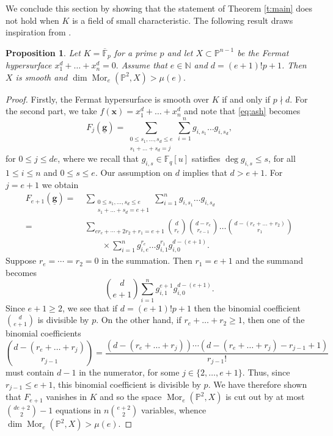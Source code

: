 \documentclass[12pt, reqno]{amsart}
\numberwithin{equation}{section}
\newcommand{\0}{\mathbf{0}}
\newcommand{\PP}{\mathbb{P}}
\newcommand{\FF}{\mathbb{F}}
\newcommand{\NN}{\mathbb{N}}
\renewcommand{\leq}{\leqslant}
\renewcommand{\geq}{\geqslant}
\newcommand{\x}{\mathbf{x}}
\def \Mor {\operatorname{Mor}}
\renewcommand{\=}{\equiv}
\newcommand{\1}{\mathbf{1}}
\newcommand{\g}{\mathbf{g}}
\newtheorem{proposition}[theorem]{Proposition}
\theoremstyle{definition}
\begin{document}
We conclude this section by showing that the statement of Theorem \ref{t:main} does not hold when $K$ is a field of small characteristic.
The following result draws inspiration from \cite[Lemma 2.1]{BS2}.

\begin{proposition}\label{p:small}
Let $K = \overline{\FF}_p$ for a prime $p$ and let $X \subset \PP^{n-1}$ be the Fermat hypersurface
$
x_1^d + \dots + x_n^d = 0.
$
Assume that $e \in \NN$ and $d = (e+1)! p + 1$. Then $X$ is smooth and
$
\dim \Mor_e (\PP^2, X) > \mu(e).
$
\end{proposition}

\begin{proof}
Firstly, the  Fermat hypersurface
is smooth over $K$ if and only if $p\nmid d$. For the second part, we take   $f (\x) = x_1^d + \dots + x_n^d$ and note that 
\eqref{eq:ash}  becomes
$$
F_j( \underline{ \g }  ) =
\sum_{ \substack{ 0 \leq s_1, \dots, s_d \leq  e \\ s_1 + \dots + s_d = j }} \sum_{i=1}^n    g_{i, s_1}   \dots  g_{i, s_d},
$$
for  $0 \leq j \leq d e$, where we recall that
$g_{i,s} \in \FF_q[u]$ satisfies  $\deg g_{i,s} \leq s$, for all $1 \leq i \leq n$ and $0 \leq s \leq e$.
Our assumption on $d$ implies that $d>e+1$.
For $j = e + 1$ we obtain
\begin{align*}
F_{e+1} ( \underline{ \g }  ) =~&
\sum_{ \substack{ 0 \leq s_1, \dots, s_d \leq  e \\ s_1 + \dots + s_d = e + 1 }} \sum_{i=1}^n    g_{i, s_1}   \dots  g_{i, s_d}
\\
=~&
\sum_{  e r_e + \cdots +  2r_2+ r_1 = e + 1   }
 \binom{d}{r_e}   \binom{d - r_e}{r_{e-1}}  \dots  \binom{d - (r_e + \dots + r_2)}{r_1 }\\
&\qquad \times  \sum_{i=1}^n    g_{i, e}^{r_e}   \dots   g_{i,1}^{r_1} g_{i,0}^{d -
(e + 1) }.
\end{align*}
Suppose $r_e=\cdots=r_2=0$
 in the summation. Then $r_1 = e + 1$ and the summand becomes
$$
\binom{d}{e + 1 }
\sum_{i=1}^n g_{i,1}^{e + 1} g_{i,0}^{d -
(e + 1) }.
$$
Since $e + 1 \geq 2$, we see that  if $d = (e+1)! p + 1$ then the binomial coefficient $\binom{d}{e + 1 }$ is divisible by $p$.
On the other hand, if $r_e + \dots + r_2 \geq 1$, then one of the binomial coefficients
$$
\binom{d - (r_e + \dots + r_j)}{r_{j-1} } = \frac{  (d - (r_e + \dots + r_j) ) \cdots ( d - (r_e + \dots + r_j) - r_{j-1} + 1 )  }{r_{j-1} !}
$$
must contain $d-1$ in the numerator,
for some $j\in \{2,\dots, e+1\}$.
Thus, since $r_{j-1} \leq e + 1$, this binomial coefficient is divisible by $p$.
We have therefore shown that $F_{e+1}$ vanishes in $K$ and so 
the space $\Mor_e(\PP^2,X)$ is cut out by at most $\binom{de + 2}{2} - 1$ equations in
$n \binom{e + 2}{2}$ variables, whence $\dim \Mor_e(\PP^2,X) >  \mu(e).$
\end{proof}
\end{document}
